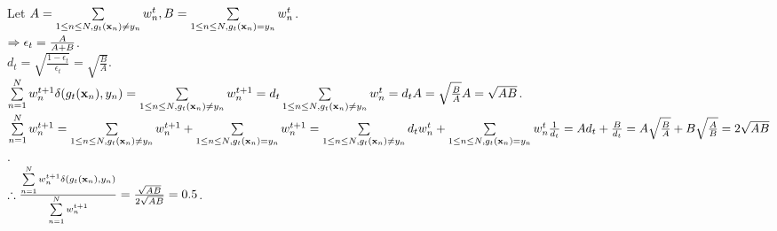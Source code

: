 \begin{pr}
Let $A=\sum\limits_{1\leq n\leq N, g_t(\mathbf{x}_n)\neq y_n}w_n^t, B=\sum\limits_{1\leq n\leq N, g_t(\mathbf{x}_n)=y_n}w_n^t$.\\
$\Rightarrow\epsilon_t=\frac{A}{A+B}$.\\
$d_t=\sqrt{\frac{1-\epsilon_t}{\epsilon_t}}=\sqrt{\frac BA}$.\\
$\sum\limits_{n=1}^Nw_n^{t+1}\delta(g_t(\mathbf{x}_n), y_n)=\sum\limits_{1\leq n\leq N, g_t(\mathbf{x}_n)\neq y_n}w_n^{t+1}=d_t\sum\limits_{1\leq n\leq N, g_t(\mathbf{x}_n)\neq y_n}w_n^t=d_tA=\sqrt{\frac BA}A=\sqrt{AB}$.\\
$\sum\limits_{n=1}^Nw_n^{t+1}=\sum\limits_{1\leq n\leq N, g_t(\mathbf{x}_n)\neq y_n}w_n^{t+1}+\sum\limits_{1\leq n\leq N, g_t(\mathbf{x}_n)=y_n}w_n^{t+1}=\sum\limits_{1\leq n\leq N, g_t(\mathbf{x}_n)\neq y_n}d_tw_n^t+\sum\limits_{1\leq n\leq N, g_t(\mathbf{x}_n)=y_n}w_n^t\frac1{d_t}=Ad_t+\frac B{d_t}=A\sqrt{\frac BA}+B\sqrt{\frac AB}=2\sqrt{AB}$.\\
$\therefore\frac{\sum\limits_{n=1}^Nw_n^{t+1}\delta(g_t(\mathbf{x}_n), y_n)}{\sum\limits_{n=1}^Nw_n^{t+1}}=\frac{\sqrt{AB}}{2\sqrt{AB}}=0.5$.
\end{pr}

